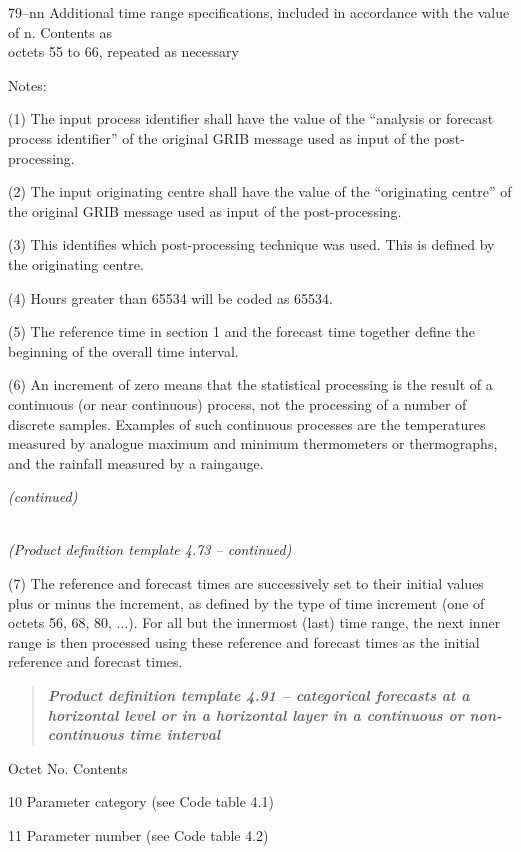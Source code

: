 79--nn Additional time range specifications, included in accordance with the value of n. Contents as\\
octets 55 to 66, repeated as necessary

Notes:

(1) The input process identifier shall have the value of the ``analysis or forecast process identifier'' of the original GRIB message used as input of the post-processing.

(2) The input originating centre shall have the value of the ``originating centre'' of the original GRIB message used as input of the post-processing.

(3) This identifies which post-processing technique was used. This is defined by the originating centre.

(4) Hours greater than 65534 will be coded as 65534.

(5) The reference time in section 1 and the forecast time together define the beginning of the overall time interval.

(6) An increment of zero means that the statistical processing is the result of a continuous (or near continuous) process, not the processing of a number of discrete samples. Examples of such continuous processes are the temperatures measured by analogue maximum and minimum thermometers or thermographs, and the rainfall measured by a raingauge.

\emph{(continued)}

\emph{\\
(Product definition template 4.73 -- continued)}

(7) The reference and forecast times are successively set to their initial values plus or minus the increment, as defined by the type of time increment (one of octets 56, 68, 80, ...). For all but the innermost (last) time range, the next inner range is then processed using these reference and forecast times as the initial reference and forecast times.

\begin{quote}
\emph{\textbf{Product definition template 4.91 -- categorical forecasts at a horizontal level or in a horizontal layer in a continuous or non-continuous time interval}}
\end{quote}

Octet No. Contents

10 Parameter category (see Code table 4.1)

11 Parameter number (see Code table 4.2)

